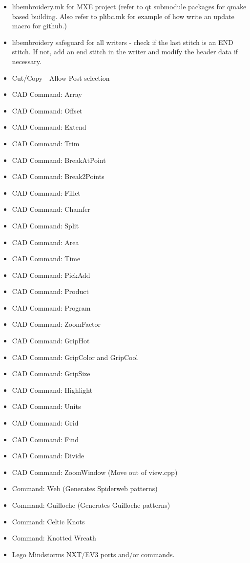\documentclass[a4paper]{report}
\begin{document}
\begin{itemize}
\item libembroidery.mk for MXE project (refer to qt submodule packages for qmake based building. Also refer to plibc.mk for example of how write an update macro for github.)
\item libembroidery safeguard for all writers - check if the last stitch is an END stitch. If not, add an end stitch in the writer and modify the header data if necessary.
\item Cut/Copy - Allow Post-selection
\item CAD Command: Array
\item CAD Command: Offset
\item CAD Command: Extend
\item CAD Command: Trim
\item CAD Command: BreakAtPoint
\item CAD Command: Break2Points
\item CAD Command: Fillet
\item CAD Command: Chamfer
\item CAD Command: Split
\item CAD Command: Area
\item CAD Command: Time
\item CAD Command: PickAdd
\item CAD Command: Product
\item CAD Command: Program
\item CAD Command: ZoomFactor
\item CAD Command: GripHot
\item CAD Command: GripColor and GripCool
\item CAD Command: GripSize
\item CAD Command: Highlight
\item CAD Command: Units
\item CAD Command: Grid
\item CAD Command: Find
\item CAD Command: Divide
\item CAD Command: ZoomWindow (Move out of view.cpp)
\item Command: Web (Generates Spiderweb patterns)
\item Command: Guilloche (Generates Guilloche patterns)
\item Command: Celtic Knots
\item Command: Knotted Wreath
\item Lego Mindstorms NXT/EV3 ports and/or commands.

\end{itemize}
\end{document}
